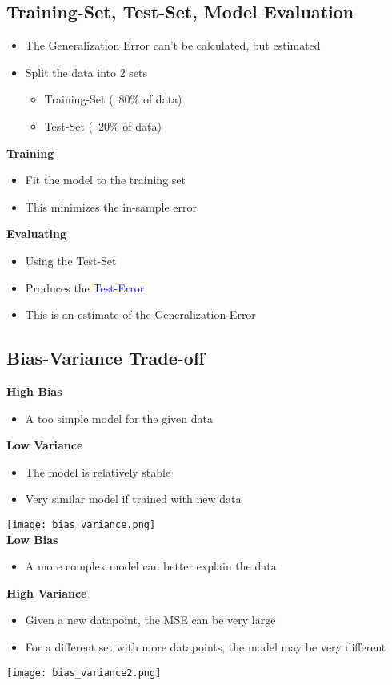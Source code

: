 \subsection{Training-Set, Test-Set, Model Evaluation}
\begin{itemize}
    \item The Generalization Error can't be calculated, but estimated
    \item Split the data into 2 sets
    \begin{itemize}
        \item Training-Set (~80\% of data)
        \item Test-Set (~20\% of data)
    \end{itemize}
\end{itemize}
\textbf{Training}
\begin{itemize}
    \item Fit the model to the training set
    \item This minimizes the in-sample error
\end{itemize}
\textbf{Evaluating}
\begin{itemize}
    \item Using the Test-Set
    \item Produces the \textcolor{blue}{Test-Error}
    \item This is an estimate of the Generalization Error
\end{itemize}

\subsection{Bias-Variance Trade-off}

\textbf{High Bias}
\begin{itemize}
    \item A too simple model for the given data
\end{itemize}
\textbf{Low Variance}
\begin{itemize}
    \item The model is relatively stable
    \item Very similar model if trained with new data
\end{itemize}
\texttt{[image: bias\_variance.png]}\\
\textbf{Low Bias}
\begin{itemize}
    \item A more complex model can better explain the data
\end{itemize}
\textbf{High Variance}
\begin{itemize}
    \item Given a new datapoint, the MSE can be very large
    \item For a different set with more datapoints, the model may be very different
\end{itemize}
\texttt{[image: bias\_variance2.png]}

